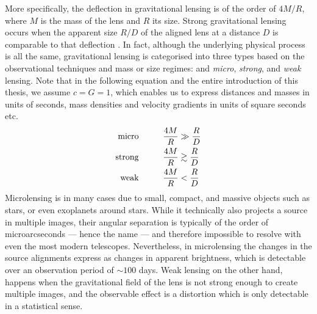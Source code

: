 More specifically, the deflection in gravitational lensing is of the order of
$4M/R$, where $M$ is the mass of the lens and $R$ its size.  Strong
gravitational lensing occurs when the apparent size $R/D$ of the aligned lens at
a distance $D$ is comparable to that deflection .  In fact,
although the underlying physical process is all the same, gravitational lensing
is categorised into three types based on the observational techniques and mass
or size regimes: and \textit{micro}, \textit{strong}, and \textit{weak} lensing.
Note that in the following equation and the entire introduction of this thesis,
we assume $c=G=1$, which enables us to express distances and masses in units of
seconds, mass densities and velocity gradients in units of square seconds etc.
%
\begin{equation}\eqlbl{lensing_types}%
  \begin{aligned}
    \text{micro} \hspace{1cm}&\frac{4M}{R} \gg \frac{R}{D}\\
    \text{strong} \hspace{1cm}&\frac{4M}{R} \gtrsim \frac{R}{D}\\
    \text{weak} \hspace{1cm}&\frac{4M}{R} < \frac{R}{D}
  \end{aligned}
\end{equation}%
%
Microlensing is in many cases due to small, compact, and massive objects such as
stars, or even exoplanets around stars.  While it technically also projects a
source in multiple images, their angular separation is typically of the order of
microarcseconds --- hence the name --- and therefore impossible to resolve with
even the most modern telescopes. Nevertheless, in microlensing the changes in
the source alignments express as changes in apparent brightness, which is
detectable over an observation period of $\sim100$ days.  Weak lensing on the
other hand, happens when the gravitational field of the lens is not strong
enough to create multiple images, and the observable effect is a distortion
which is only detectable in a statistical sense.

